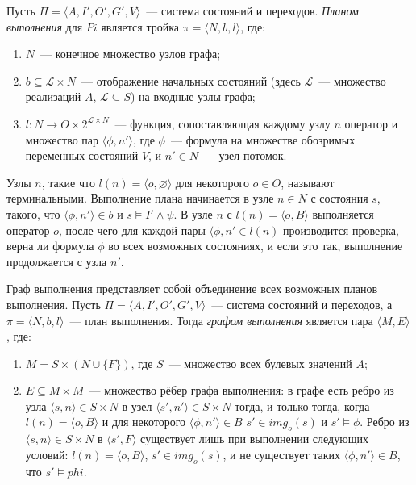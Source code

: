 Пусть $\Pi = \langle A, I', O', G', V \rangle$~--- система состояний и переходов. \textit{Планом выполнения} для $Pi$ является тройка $\pi = \langle N, b, l \rangle$, где:

\begin{enumerate}
 \item $N$~--- конечное множество узлов графа;
 \item $b \subseteq \mathcal{L} \times N$~--- отображение начальных состояний (здесь $\mathcal{L}$~--- множество реализаций $A$, $\mathcal{L} \subseteq S$) на входные узлы графа;
 \item $l: N \rightarrow O \times 2^{\mathcal{L} \times N}$~--- функция, сопоставляющая каждому узлу $n$ оператор и множество пар $ \langle \phi, n' \rangle$, где $\phi$~--- формула на множестве обозримых переменных состояний $V$, и $n' \in N$~--- узел-потомок.
\end{enumerate}

Узлы $n$, такие что $l(n) = \langle o, \varnothing \rangle$ для некоторого $o \in O$, называют терминальными. Выполнение плана начинается в узле $n \in N$ с состояния $s$, такого, что $\langle \phi, n' \rangle \in b$ и $s \models I' \wedge \psi$. В узле $n$ с $l(n) = \langle o, B \rangle$ выполняется оператор $o$, после чего для каждой пары $\langle \phi, n' \in l(n)$ производится проверка, верна ли формула $\phi$ во всех возможных состояниях, и если это так, выполнение продолжается с узла $n'$. %

Граф выполнения представляет собой объединение всех возможных планов выполнения. Пусть $\Pi = \langle A, I', O', G', V \rangle$~--- система состояний и переходов, а $\pi = \langle N, b, l \rangle$~--- план выполнения. Тогда \textit{графом выполнения} является пара $\langle M, E \rangle$, где:
\begin{enumerate}
 \item $M = S \times (N \cup \{ F \})$, где $S$~--- множество всех булевых значений $A$;
 \item $E \subseteq M \times M$~--- множество рёбер графа выполнения: в графе есть ребро из узла $\langle s, n \rangle \in S \times N$ в узел $\langle s', n' \rangle \in S \times N$ тогда, и только тогда, когда $l(n) = \langle o, B \rangle$ и для некоторого $\langle \phi, n' \rangle \in B$ $s' \in img_o(s)$ и $s' \models \phi$. Ребро из $\langle s, n \rangle \in S \times N$ в $\langle s', F \rangle$ существует лишь при выполнении следующих условий: $l(n) = \langle o, B \rangle$, $s' \in img_o(s)$, и не существует таких $\langle \phi, n' \rangle \in B$, что $s' \models phi$.
\end{enumerate}

